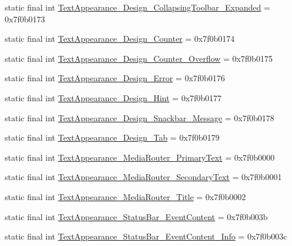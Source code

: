 \begin{CompactItemize}
\item 
static final int \hyperlink{classandroid_1_1support_1_1v7_1_1mediarouter_1_1_r_1_1style_f46d9a078eb3dfe95ae8ddf9a4e384f3}{TextAppearance\_\-Design\_\-CollapsingToolbar\_\-Expanded} = 0x7f0b0173
\item 
static final int \hyperlink{classandroid_1_1support_1_1v7_1_1mediarouter_1_1_r_1_1style_dda41e6e84d3fad87196042d4d0194d2}{TextAppearance\_\-Design\_\-Counter} = 0x7f0b0174
\item 
static final int \hyperlink{classandroid_1_1support_1_1v7_1_1mediarouter_1_1_r_1_1style_6217db3dc34606e68e1610662a1fa5d2}{TextAppearance\_\-Design\_\-Counter\_\-Overflow} = 0x7f0b0175
\item 
static final int \hyperlink{classandroid_1_1support_1_1v7_1_1mediarouter_1_1_r_1_1style_cf90b0dd01f01e96c898e1364a5cc451}{TextAppearance\_\-Design\_\-Error} = 0x7f0b0176
\item 
static final int \hyperlink{classandroid_1_1support_1_1v7_1_1mediarouter_1_1_r_1_1style_c476186237fa09a273d2e7e72f29cb19}{TextAppearance\_\-Design\_\-Hint} = 0x7f0b0177
\item 
static final int \hyperlink{classandroid_1_1support_1_1v7_1_1mediarouter_1_1_r_1_1style_67d008cb770176af75a46a5a689fca22}{TextAppearance\_\-Design\_\-Snackbar\_\-Message} = 0x7f0b0178
\item 
static final int \hyperlink{classandroid_1_1support_1_1v7_1_1mediarouter_1_1_r_1_1style_510b75cd2a11f850902e7552889bcc4a}{TextAppearance\_\-Design\_\-Tab} = 0x7f0b0179
\item 
static final int \hyperlink{classandroid_1_1support_1_1v7_1_1mediarouter_1_1_r_1_1style_d803675d1e8a2c62e05e71542da1ba02}{TextAppearance\_\-MediaRouter\_\-PrimaryText} = 0x7f0b0000
\item 
static final int \hyperlink{classandroid_1_1support_1_1v7_1_1mediarouter_1_1_r_1_1style_d52022c53f45259028ae276d590a29a9}{TextAppearance\_\-MediaRouter\_\-SecondaryText} = 0x7f0b0001
\item 
static final int \hyperlink{classandroid_1_1support_1_1v7_1_1mediarouter_1_1_r_1_1style_d1d2ae46809f09e33a3f32f9a7b4c779}{TextAppearance\_\-MediaRouter\_\-Title} = 0x7f0b0002
\item 
static final int \hyperlink{classandroid_1_1support_1_1v7_1_1mediarouter_1_1_r_1_1style_d3c1ea15c0eff987a544cb11fce51631}{TextAppearance\_\-StatusBar\_\-EventContent} = 0x7f0b003b
\item 
static final int \hyperlink{classandroid_1_1support_1_1v7_1_1mediarouter_1_1_r_1_1style_05c84fe6125aa828f08ce4ce6e6ff6ea}{TextAppearance\_\-StatusBar\_\-EventContent\_\-Info} = 0x7f0b003c

\end{CompactItemize}
